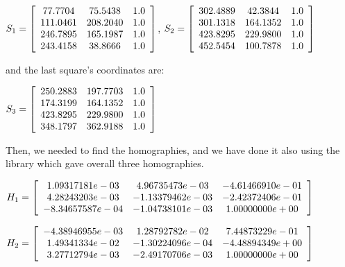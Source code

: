 \documentclass[]{article}
\begin{document}
\vspace{0.5em}

\centerline {
		$S_1 =\left[ {\begin{array}{*{20}c}
		77.7704 & 75.5438 & 1.0 \\
		111.0461 & 208.2040 & 1.0  \\ 
		246.7895 & 165.1987 & 1.0 \\
		243.4158 & 38.8666 & 1.0  
		\end{array} } \right] $, $S_2 =\left[ {\begin{array}{*{20}c}
		302.4889 & 42.3844 & 1.0 \\
		301.1318 & 164.1352 & 1.0  \\ 
		423.8295 & 229.9800 & 1.0 \\
		452.5454 & 100.7878 & 1.0  
		\end{array} } \right] $
}

\vspace{0.5em}

and the last square's coordinates are: 

\vspace{0.5em}

\centerline {
	$S_3 =\left[ {\begin{array}{*{20}c}
		250.2883 & 197.7703 & 1.0 \\
		174.3199 & 164.1352 & 1.0  \\ 
		423.8295 & 229.9800 & 1.0 \\
		348.1797 & 362.9188 & 1.0  
		\end{array} } \right] $
}

\vspace{0.5em}

Then, we needed to find the homographies, and we have done it also using the library which gave overall three homographies. 

\vspace{0.5em}

\centerline {
	$H_1 =\left[ {\begin{array}{*{20}c}
		1.09317181e-03 & 4.96735473e-03 & -4.61466910e-01 \\
		4.28243203e-03 & -1.13379462e-03 & -2.42372406e-01  \\ 
		-8.34657587e-04 & -1.04738101e-03 & 1.00000000e+00 
		\end{array} } \right] $
}

\vspace{0.5em}

\centerline {
	$H_2 =\left[ {\begin{array}{*{20}c}
		-4.38946955e-03 & 1.28792782e-02 & 7.44873229e-01 \\
		1.49341334e-02 & -1.30224096e-04 & -4.48894349e+00  \\ 
		3.27712794e-03 & -2.49170706e-03 & 1.00000000e+00
		\end{array} } \right] $
}
\end{document}
